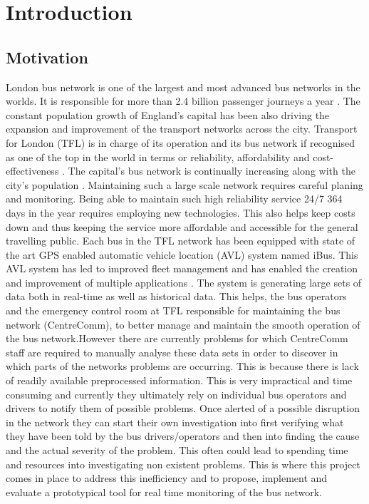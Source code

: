 \chapter{Introduction}
\section{Motivation}
London bus network is one of the largest and most advanced bus networks in the worlds. It is responsible for more than 2.4 billion passenger journeys a year \cite{TFL1}. The constant population growth of England's capital has been also driving the expansion and improvement of the transport networks across the city. Transport for London (TFL) is in charge of its operation and its bus network if recognised as one of the top in the world in terms or reliability, affordability and cost-effectiveness \cite{TFL1}. The capital's bus network is continually increasing along with the city's population \cite{TFL2}. 
Maintaining such a large scale network requires careful planing and monitoring. Being able to maintain such high reliability service 24/7 364 days in the year requires employing new technologies. This also helps keep costs down and thus keeping the service more affordable and accessible for the general travelling public. Each bus in the TFL network has been equipped with state of the art GPS enabled automatic vehicle location (AVL) system named iBus\cite{ibusdeployment}. This AVL system has led to improved fleet management and has enabled the creation and improvement of multiple applications \cite{eps354267}.
The system is generating large sets of data both in real-time as well as historical data. This helps, the bus operators and the emergency control room at TFL responsible for maintaining the bus network (CentreComm), to better manage and maintain the smooth operation of the bus network.However there are currently problems for which CentreComm staff are required to manually analyse these data sets in order to discover in which parts of the networks problems are occurring. This is because there is lack of readily available preprocessed information. This is very impractical and time consuming and currently they ultimately rely on individual bus operators and drivers to notify them of possible problems. Once alerted of a possible disruption in the network they can start their own investigation into first verifying what they have been told by the bus drivers/operators and then into finding the cause and the actual severity of the problem. This often could lead to spending time and resources into investigating non existent problems. This is where this project comes in place to address this inefficiency and to propose, implement and evaluate a prototypical tool for real time monitoring of the bus network.

